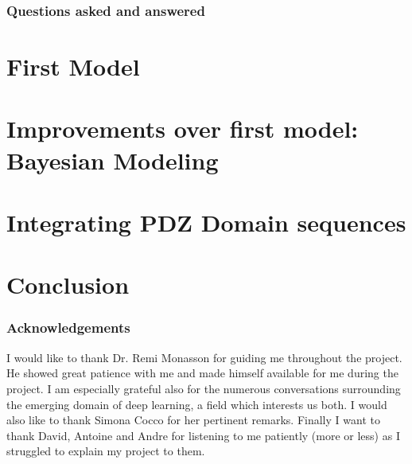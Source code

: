 \documentclass[a4paper, 12pt]{article}
\begin{document}
	\section{Questions asked and answered}

\part{First Model}
\part{Improvements over first model: Bayesian Modeling}
\part{Integrating PDZ Domain sequences} 
\part{Conclusion}

\section*{Acknowledgements}
I would like to thank Dr. Remi Monasson for guiding me throughout the project. He showed great patience with me and made himself available for me during the project. I am especially grateful also for the numerous conversations surrounding the emerging domain of deep learning, a field which interests us both. I would also like to thank Simona Cocco for her pertinent remarks. Finally I want to thank David, Antoine and Andre for listening to me patiently (more or less) as I struggled to explain my project to them. 
\end{document}

